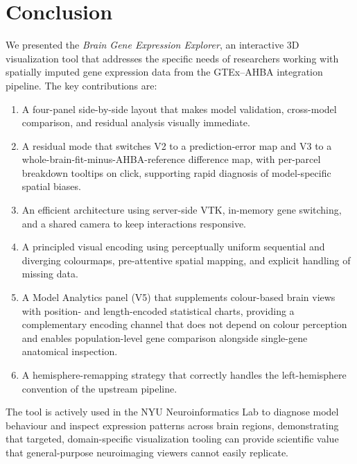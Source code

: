 \documentclass[11pt,letterpaper]{article}
\begin{document}
\section{Conclusion}
\label{sec:conclusion}

We presented the \emph{Brain Gene Expression Explorer}, an interactive
3D visualization tool that addresses the specific needs of researchers
working with spatially imputed gene expression data from the GTEx--AHBA
integration pipeline.
The key contributions are:

\begin{enumerate}[nosep]
  \item A four-panel side-by-side layout that makes model validation,
        cross-model comparison, and residual analysis visually immediate.
  \item A residual mode that switches V2 to a prediction-error map and V3
        to a whole-brain-fit-minus-AHBA-reference difference map, with
        per-parcel breakdown tooltips on click, supporting rapid diagnosis
        of model-specific spatial biases.
  \item An efficient architecture using server-side VTK, in-memory gene
        switching, and a shared camera to keep interactions responsive.
  \item A principled visual encoding using perceptually uniform sequential
        and diverging colourmaps, pre-attentive spatial mapping, and
        explicit handling of missing data.
  \item A Model Analytics panel (V5) that supplements colour-based brain
        views with position- and length-encoded statistical charts, providing
        a complementary encoding channel that does not depend on colour
        perception and enables population-level gene comparison alongside
        single-gene anatomical inspection.
  \item A hemisphere-remapping strategy that correctly handles the
        left-hemisphere convention of the upstream pipeline.
\end{enumerate}

The tool is actively used in the NYU Neuroinformatics Lab to diagnose
model behaviour and inspect expression patterns across brain regions,
demonstrating that targeted, domain-specific visualization tooling can
provide scientific value that general-purpose neuroimaging viewers
cannot easily replicate.
\end{document}
